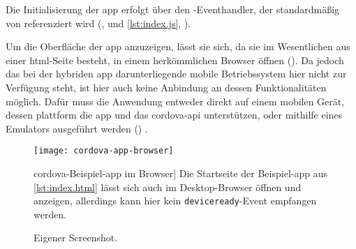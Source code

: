 {Die Initialisierung der \gls{app} erfolgt über den -Eventhandler, der standardmäßig von  referenziert wird (,  und \autoref{lst:index.js}, ).


\par\noindent\begin{minipage}{\linewidth}

\end{minipage}\par\addvspace{\topskip}


\par\noindent\begin{minipage}{\linewidth}

\end{minipage}\par\addvspace{\topskip}

Um die Oberfläche der \gls{app} anzuzeigen, lässt sie sich, da sie im Wesentlichen aus einer \gls{html}-Seite besteht, in einem herkömmlichen Browser öffnen ().
Da jedoch das bei der hybriden \gls{app} darunterliegende mobile Betriebssystem hier nicht zur Verfügung steht, ist hier auch keine Anbindung an dessen Funktionalitäten möglich.
Dafür muss die Anwendung entweder direkt auf einem mobilen Gerät, dessen \gls{plattform} die \gls{app} und das \gls{cordova}-\gls{api} unterstützen, oder mithilfe eines Emulators ausgeführt werden () \cite{Cordova-Docs_CLI}.

\begin{figure}[h!]
\centering
\texttt{[image: cordova-app-browser]}
	\caption
	[\gls{cordova}-Beispiel-\gls{app} im Browser]
	{Die Startseite der Beispiel-\gls{app} aus \autoref{lst:index.html} lässt sich auch im Desktop-Browser öffnen und anzeigen, allerdings kann hier kein \lstinline|deviceready|-Event empfangen werden.}
	\label{fig:cordova-app-browser}
		\imagesourcefont
		\vspace{\imagesourcespace}
		\imagesourcefont{}
		\caption*{\imagesourcelabel Eigener Screenshot.}
\end{figure}

}
